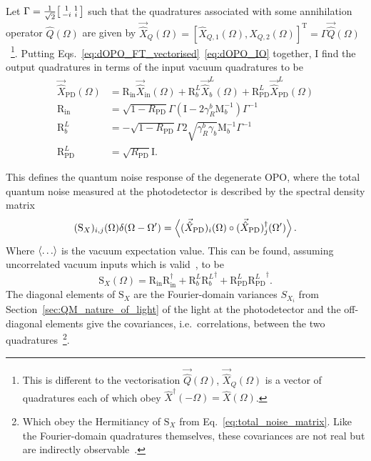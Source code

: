 Let $\Gamma = \frac{1}{\sqrt2} \begin{bsmallmatrix}1 & 1 \\-i & i\end{bsmallmatrix}$ such that the quadratures associated with some annihilation operator $\hat{Q}(\Omega)$ are given by $\vec{\hat{X}}_Q(\Omega)=[\hat{X}_{Q,1}(\Omega),\hat{X}_{Q,2}(\Omega)]^\text{T}=\Gamma \vec{\hat{Q}}(\Omega)$~\footnote{This is different to the vectorisation $\vec{\hat{Q}}(\Omega)$, $\vec{\hat{X}}_Q(\Omega)$ is a vector of quadratures each of which obey $\hat{X}^\dag(-\Omega)=\hat{X}(\Omega)$.}. Putting Eqs.~\ref{eq:dOPO_FT_vectorised}~\ref{eq:dOPO_IO} together, I find the output quadratures in terms of the input vacuum quadratures to be
\begin{align}
\label{eq:dOPO_PD_as_fn_of_vac}
\vec{\hat X}_\mathrm{PD}(\Omega)&=\text{R}_\text{in}\vec{\hat X}_\mathrm{in}(\Omega)+\text{R}^L_b\vec{\hat X}^L_b(\Omega)+\text{R}^L_\text{PD}\vec{\hat X}^L_\text{PD}(\Omega)\\
\text{R}_\text{in}&=\sqrt{1-R_\text{PD}}\Gamma\left(\text{I}-2\gamma^b_R\text{M}_b^{-1}\right)\Gamma^{-1}\\
\text{R}^L_b&=-\sqrt{1-R_\text{PD}}\Gamma 2\sqrt{\gamma^b_R \gamma_b}\text{M}_b^{-1}\Gamma^{-1}\\
\text{R}^L_\text{PD}&=\sqrt{R_\text{PD}} \text{I}.
\end{align}

This defines the quantum noise response of the degenerate OPO, where the total quantum noise measured at the photodetector is described by the spectral density matrix 
\begin{equation}\label{eq:total_noise_matrix}
(\text{S}_X)_{i,j}(\Omega)\delta(\Omega-\Omega')=\ev{(\vec{\hat X}_\text{PD})_i(\Omega)\circ(\vec{\hat X}_\text{PD})_j^\dag(\Omega')}.
\end{equation}
Where $\ev{\ldots}$ is the vacuum expectation value. This can be found, assuming uncorrelated vacuum inputs which is valid~\cite{}, to be
\begin{equation}\label{eq:dOPO_Sx_abstract}
\text{S}_X(\Omega)=\text{R}_\text{in} \text{R}_\text{in}^\dag+\text{R}^L_b {\text{R}^L_b}^\dag+\text{R}^L_\text{PD}{\text{R}^L_\text{PD}}^\dag.
\end{equation}
The diagonal elements of $\text{S}_X$ are the Fourier-domain variances $S_{X_i}$ from Section~\ref{sec:QM_nature_of_light} of the light at the photodetector and the off-diagonal elements give the covariances, i.e.\ correlations, between the two quadratures~\footnote{Which obey the Hermitiancy of $\text{S}_X$ from Eq.~\ref{eq:total_noise_matrix}. Like the Fourier-domain quadratures themselves, these covariances are not real but are indirectly observable~\cite{}.}.

